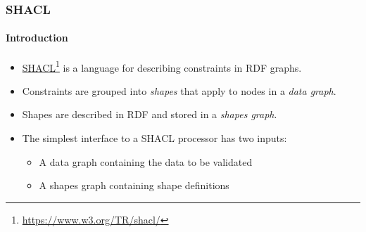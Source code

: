 \documentclass{beamer}
\newcommand{\fnhref}[2]{\href{#2}{#1}\footnote{\url{#2}}}
\begin{document}
\begin{frame}
  \frametitle{SHACL}
  \framesubtitle{Introduction}

  \begin{itemize}
    \item \fnhref{SHACL}{https://www.w3.org/TR/shacl/} is a language for
      describing constraints in RDF graphs.

    \item Constraints are grouped into \textit{shapes} that apply to nodes in a
      \textit{data graph}.

    \item Shapes are described in RDF and stored in a \textit{shapes graph}.

    \item The simplest interface to a SHACL processor has two inputs:

    \begin{itemize}
      \item A data graph containing the data to be validated

      \item A shapes graph containing shape definitions
    \end{itemize}
  \end{itemize}
\end{frame}
\end{document}
